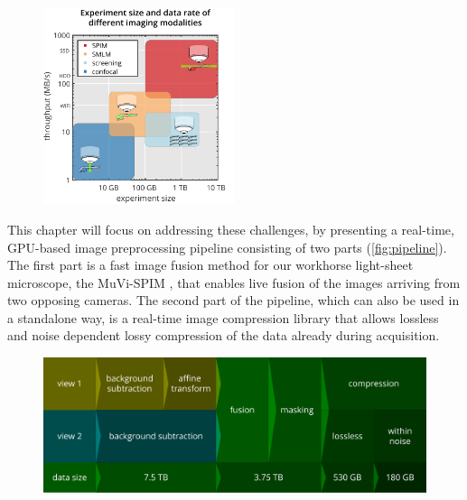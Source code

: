   \begin{figure}[btp]
    \centering
    \includegraphics[page=1,width=0.5\textwidth]{comparison_with_pictograms}
    \label{fig:sizes}
  \end{figure}


  This chapter will focus on addressing these challenges, by presenting a real-time, GPU-based image preprocessing pipeline consisting of two parts (\autoref{fig:pipeline}).
  The first part is a fast image fusion method for our workhorse light-sheet microscope, the MuVi-SPIM \cite{krzic_multiview_2012}, that enables live fusion of the images arriving from two opposing cameras.
  The second part of the pipeline, which can also be used in a standalone way, is a real-time image compression library that allows lossless and noise dependent lossy compression of the data already during acquisition.

  \begin{figure}
    \centering
    \includegraphics[width=\textwidth]{pipeline}
    \label{fig:pipeline}
  \end{figure}



